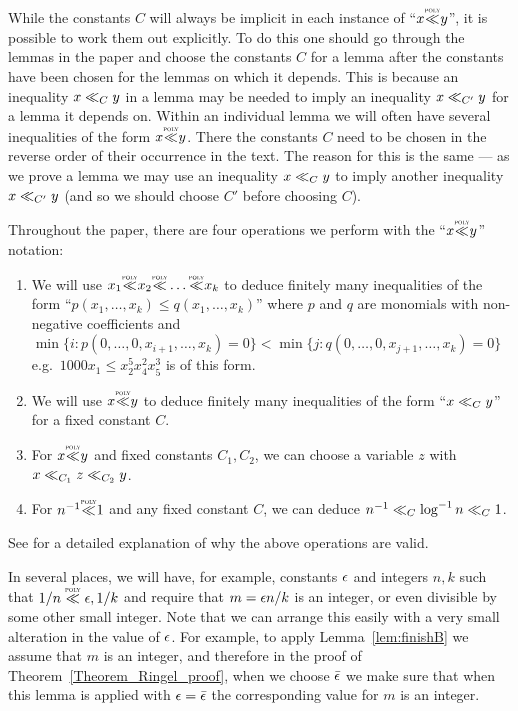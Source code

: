 While the constants $C$ will always be implicit in each instance  of ``$x\LL{} y$'',  it is possible to work  them out explicitly. To do this one should go through the lemmas in the paper and choose the constants $C$ for a lemma after the constants have been chosen for the lemmas on which it depends. This is because an inequality $x\oldll_C y$ in a lemma  may be needed to imply an inequality $x\oldll_{C'} y$ for a lemma it depends on. Within an individual lemma we will often have several inequalities of the form $x\LL y$. There the constants $C$ need to be chosen in the reverse order of their occurrence in the text. The reason for this is the same --- as we prove a lemma we may use an inequality  $x\oldll_C y$  to imply another inequality $x\oldll_{C'} y$ (and so we should choose $C'$ before choosing $C$).

Throughout the paper, there are four operations we perform with the ``$x\LL{} y$'' notation:
\begin{enumerate}[label = (\alph{enumi})]
\item We will use $x_1\LL x_2\LL\dots\LL x_k$ to deduce finitely many inequalities of the form ``$p(x_1, \dots, x_k)\leq q(x_1, \dots, x_k)$'' where $p$ and $q$ are {monomials} with non-negative coefficients and $\min\{i: p(0, \dots, 0, x_{i+1}, \dots, x_k)=0\}< \min\{j: q(0, \dots, 0, x_{j+1}, \dots, x_k)=0\}$  e.g.\ $1000x_1\leq x_2^5x_4^2x_5^3$ is of this form.
\item We will use $x\LL y$ to deduce finitely many inequalities of the form ``$x\oldll_C y$'' for a fixed constant $C$.
\item For $x\LL y$ and  fixed constants $C_1, C_2$, we can choose a variable $z$ with $x\oldll_{C_1} z\oldll_{C_2}y$.
\item For $n^{-1}\LL 1$ and any fixed constant $C$, we can deduce $n^{-1}\oldll_C \log^{-1} n\oldll_C 1$.
\end{enumerate}
See \cite{montgomery2018decompositions} for a detailed explanation of why the above operations are valid.



In several places, we will have, for example, constants $\epsilon$ and integers $n,k$ such that $1/n\ll \eps,1/k$ and require that $m=\epsilon n/k$ is an integer, or even divisible by some other small integer. Note that we can arrange this easily with a very small alteration in the value of $\epsilon$. For example, to apply Lemma~\ref{lem:finishB} we assume that $m$ is an integer, and therefore in the proof of Theorem~\ref{Theorem_Ringel_proof}, when we choose $\bar{\epsilon}$ we make sure that when this lemma is applied with $\epsilon=\bar{\epsilon}$ the corresponding value for $m$ is an integer.

